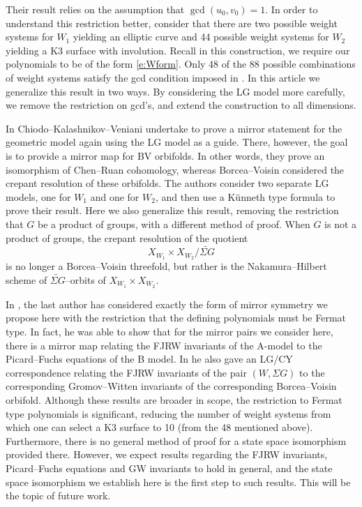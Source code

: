 \documentclass[10pt, letterpaper]{amsart}
\theoremstyle{remark}
\newcommand{\s}[1]{\Sigma #1}
\begin{document}
Their result relies on the assumption that $\gcd(u_0,v_0)=1$. In order to understand this restriction better, consider that there are two possible weight systems for $W_1$ yielding an elliptic curve and 44 possible weight systems for $W_2$ yielding a K3 surface with involution. Recall in this construction, we require our polynomials to be of the form \eqref{e:Wform}. Only 48 of the 88 possible combinations of weight systems satisfy the gcd condition imposed in \cite{ABS}. In this article we generalize this result in two ways. By considering the LG model more carefully, we remove the restriction on gcd's, and extend the construction to all dimensions. 

In \cite{CKV} Chiodo--Kalashnikov--Veniani undertake to prove a mirror statement for the geometric model again using the LG model as a guide. There, however, the goal is to provide a mirror map for BV orbifolds. In other words, they prove an isomorphism of Chen--Ruan cohomology, whereas Borcea--Voisin considered the crepant resolution of these orbifolds. The authors consider two separate LG models, one for $W_1$ and one for $W_2$, and then use a K\"unneth type formula to prove their result. Here we also generalize this result, removing the restriction that $G$ be a product of groups, with a different method of proof. When $G$ is not a product of groups, the crepant resolution of the quotient
\[
X_{W_1}\times X_{W_2}/\widetilde{\s{G}}
\] 
is no longer a Borcea--Voisin threefold, but rather is the Nakamura--Hilbert scheme of $\widetilde{\s{G}}$--orbits of $X_{W_1}\times X_{W_2}$.

In \cite{Schaug}, the last author has considered exactly the form of mirror symmetry we propose here with the restriction that the defining polynomials must be Fermat type. In fact, he was able to show that for the mirror pairs we consider here, there is a mirror map relating the FJRW invariants of the A-model to the Picard--Fuchs equations of the B model. In \cite{Schaug2} he also gave an LG/CY correspondence relating the FJRW invariants of the pair $(W,\s{G})$ to the corresponding Gromov--Witten invariants of the corresponding Borcea--Voisin orbifold. Although these results are broader in scope, the restriction to Fermat type polynomials is  significant, reducing the number of weight systems from which one can select a K3 surface to 10 (from the 48 mentioned above). Furthermore, there is no general method of proof for a state space isomorphism provided there. However, we expect results regarding the FJRW invariants, Picard--Fuchs equations and GW invariants to hold in general, and the state space isomorphism we establish here is the first step to such results. This will be the topic of future work. 
\end{document}
